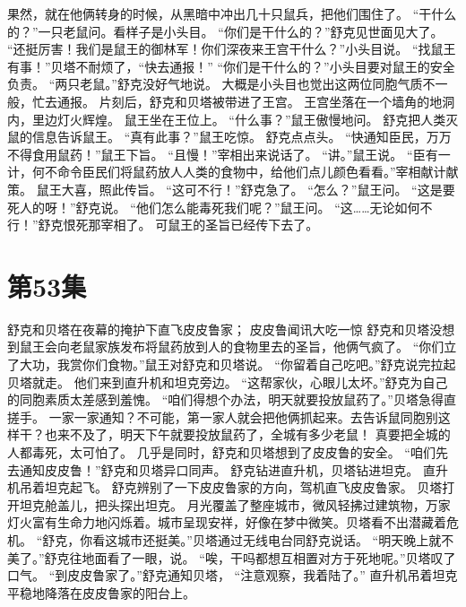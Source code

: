 \documentclass[a4paper,12pt,UTF8,twoside]{ctexbook}
\begin{document}
        果然，就在他俩转身的时候，从黑暗中冲出几十只鼠兵，把他们围住了。 
        “干什么的？”一只老鼠问。看样子是小头目。 
        “你们是干什么的？”舒克见世面见大了。 
        “还挺厉害！我们是鼠王的御林军！你们深夜来王宫干什么？”小头目说。 
        “找鼠王有事！”贝塔不耐烦了，“快去通报！” 
        “你们是干什么的？”小头目要对鼠王的安全负责。 
        “两只老鼠。”舒克没好气地说。 
        大概是小头目也觉出这两位同胞气质不一般，忙去通报。 
        片刻后，舒克和贝塔被带进了王宫。 
        王宫坐落在一个墙角的地洞内，里边灯火辉煌。 
        鼠王坐在王位上。 
        “什么事？”鼠王傲慢地问。 
        舒克把人类灭鼠的信息告诉鼠王。 
        “真有此事？”鼠王吃惊。 
        舒克点点头。 
        “快通知臣民，万万不得食用鼠药！”鼠王下旨。 
        “且慢！”宰相出来说话了。 
        “讲。”鼠王说。 
        “臣有一计，何不命令臣民们将鼠药放人人类的食物中，给他们点儿颜色看看。”宰相献计献策。 
        鼠王大喜，照此传旨。 
        “这可不行！”舒克急了。 
        “怎么？”鼠王问。 
        “这是要死人的呀！”舒克说。 
        “他们怎么能毒死我们呢？”鼠王问。 
        “这……无论如何不行！”舒克恨死那宰相了。 
        可鼠王的圣旨已经传下去了。   \chapter{第53集} 
        舒克和贝塔在夜幕的掩护下直飞皮皮鲁家； 
        皮皮鲁闻讯大吃一惊   
        舒克和贝塔没想到鼠王会向老鼠家族发布将鼠药放到人的食物里去的圣旨，他俩气疯了。 
        “你们立了大功，我赏你们食物。”鼠王对舒克和贝塔说。 
        “你留着自己吃吧。”舒克说完拉起贝塔就走。 
        他们来到直升机和坦克旁边。 
        “这帮家伙，心眼儿太坏。”舒克为自己的同胞素质太差感到羞愧。 
        “咱们得想个办法，明天就要投放鼠药了。”贝塔急得直搓手。 
        一家一家通知？不可能，第一家人就会把他俩抓起来。去告诉鼠同胞别这样干？也来不及了，明天下午就要投放鼠药了，全城有多少老鼠！ 
        真要把全城的人都毒死，太可怕了。 
        几乎是同时，舒克和贝塔想到了皮皮鲁的安全。 
        “咱们先去通知皮皮鲁！”舒克和贝塔异口同声。 
        舒克钻进直升机，贝塔钻进坦克。 
        直升机吊着坦克起飞。 
        舒克辨别了一下皮皮鲁家的方向，驾机直飞皮皮鲁家。 
        贝塔打开坦克舱盖儿，把头探出坦克。 
        月光覆盖了整座城市，微风轻拂过建筑物，万家灯火富有生命力地闪烁着。城市呈现安祥，好像在梦中微笑。贝塔看不出潜藏着危机。 
        “舒克，你看这城市还挺美。”贝塔通过无线电台同舒克说话。 
        “明天晚上就不美了。”舒克往地面看了一眼，说。 
        “唉，干吗都想互相置对方于死地呢。”贝塔叹了口气。 
        “到皮皮鲁家了。”舒克通知贝塔，  “注意观察，我着陆了。” 
        直升机吊着坦克平稳地降落在皮皮鲁家的阳台上。 
\end{document}
